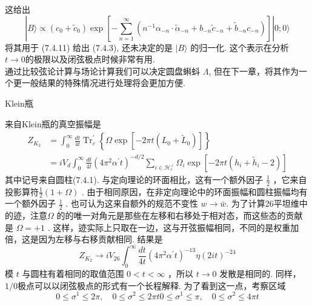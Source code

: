 这给出
\begin{equation}
	|B\rangle \propto\left(c_{0}+\tilde{c}_{0}\right) \exp \left[-\sum_{n=1}^{\infty}\left(n^{-1} \alpha_{-n} \cdot \tilde{\alpha}_{-n}+b_{-n} \tilde{c}_{-n}+\tilde{b}_{-n} c_{-n}\right)\right]|0 ; 0\rangle
\end{equation}
将其用于 (7.4.11) 给出 (7.4.3), 还未决定的是 $|B\rangle$ 的归一化. 这个表示在分析 $t \rightarrow 0$的极限以及闭弦极点时候非常有用.\\
通过比较弦论计算与场论计算我们可以决定圆盘蝌蚪 $\Lambda$, 但在下一章，将其作为一个更一般结果的特殊情况进行处理将会更加方便.\\

\centerline{\Large Klein瓶}
来自Klein瓶的真空振幅是
\begin{equation}
	\begin{aligned}
		Z_{K_{2}} &=\int_{0}^{\infty} \frac{d t}{4 t} \operatorname{Tr}_{c}^{\prime}\left\{\Omega \exp \left[-2 \pi t\left(L_{0}+\tilde{L}_{0}\right)\right]\right\} \\
		&=i V_{d} \int_{0}^{\infty} \frac{d t}{4 t}\left(4 \pi^{2} \alpha^{\prime} t\right)^{-d / 2} \sum_{i \in \mathscr{H}_{c}^{\perp}} \Omega_{i} \exp \left[-2 \pi t\left(h_{i}+\tilde{h}_{i}-2\right)\right]
	\end{aligned}
\end{equation}
其中记号来自圆柱(7.4.1). 与定向理论的环面相比，这有一个额外因子 $\frac{1}{2}$ ，它来自投影算符$\frac{1}{2}(1+\Omega) $ . 由于相同原因，在非定向理论中的环面振幅和圆柱振幅均有一个额外因子 $\frac{1}{2}$ . 也可认为这来自额外的规范不变性 $w \rightarrow \bar{w}$. 为了计算26平坦维中的迹，注意$\Omega$ 的的唯一对角元是那些在左移和右移处于相对态，而这些态的贡献是 $\Omega=+1 $ . 这样，迹实际上只取在一边，这与开弦振幅相同，不同的是权重加倍，这是因为左移与右移贡献相同. 结果是
\begin{equation}
	Z_{K_{2}} \rightarrow i V_{26} \int_{0}^{\infty} \frac{d t}{4 t}\left(4 \pi^{2} \alpha^{\prime} t\right)^{-13} \eta(2 i t)^{-24}
\end{equation}
模 $t$ 与圆柱有着相同的取值范围 $0<t<\infty$ ，所以 $t \rightarrow 0$ 发散是相同的. 同样，$1 / 0$极点可以以闭弦极点的形式有一个长程解释. 为了看到这一点，考察区域
\begin{subequations}
\begin{equation}
0 \leq \sigma^{1} \leq 2 \pi, \quad 0 \leq \sigma^{2} \leq 2 \pi t 
\end{equation}
\begin{equation}
0 \leq \sigma^{1} \leq \pi, \quad 0 \leq \sigma^{2} \leq 4 \pi t
\end{equation}		
\end{subequations}
